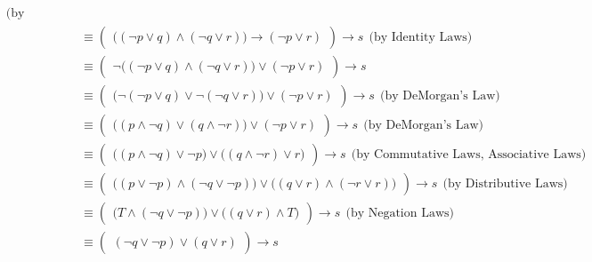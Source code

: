 \documentclass[a4paper,12pt]{article}
\begin{document}
\begin{spacing}{1.4}
\begin{align*}
        \ \ \text{(by Domination Laws)}\\
        &\equiv \left( \begin{array}{c}
        \big( (\neg p \vee q) \wedge (\neg q\vee r)\big) 
        \rightarrow (\neg p \vee r)
        \end{array} \right) \rightarrow s
        \ \ \text{(by Identity Laws)}\\
        &\equiv \left( \begin{array}{c}
        \neg \big( (\neg p \vee q) \wedge (\neg q\vee r)\big) 
        \vee (\neg p \vee r)
        \end{array} \right) \rightarrow s\\
        &\equiv \left( \begin{array}{c}
        \big( \neg (\neg p \vee q) \vee \neg (\neg q\vee r)\big) 
        \vee (\neg p \vee r)
        \end{array} \right) \rightarrow s
        \ \ \text{(by DeMorgan's Law)}\\
        &\equiv \left( \begin{array}{c}
        \big( (p \wedge \neg q) \vee (q\wedge \neg r)\big) 
        \vee (\neg p \vee r)
        \end{array} \right) \rightarrow s
        \ \ \text{(by DeMorgan's Law)}\\
        &\equiv \left( \begin{array}{c}
        \big( (p \wedge \neg q) \vee \neg p \big) \vee
        \big((q\wedge \neg r)\vee r\big)
        \end{array} \right) \rightarrow s
        \ \ \text{(by Commutative Laws, Associative Laws)}\\
        &\equiv \left( \begin{array}{c}
        \big( (p\vee \neg p)\wedge (\neg q \vee \neg p) \big) \vee
        \big( (q\vee r) \wedge (\neg r \vee r) \big)
        \end{array} \right) \rightarrow s
        \ \ \text{(by Distributive Laws)}\\
        &\equiv \left( \begin{array}{c}
        \big( T \wedge (\neg q \vee \neg p) \big) \vee
        \big( (q\vee r) \wedge T \big)
        \end{array} \right) \rightarrow s
        \ \ \text{(by Negation Laws)}\\
        &\equiv \left( \begin{array}{c}
        (\neg q \vee \neg p) \vee (q\vee r)
        \end{array} \right) \rightarrow s

\end{align*}
\end{spacing}
\end{document}
